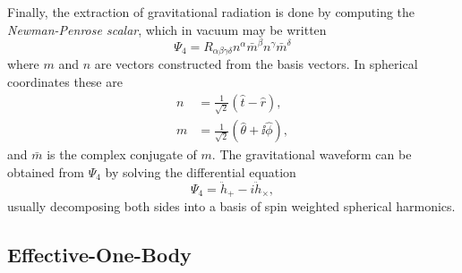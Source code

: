 Finally, the extraction of gravitational radiation is done by computing 
the \emph{Newman-Penrose scalar}, which in vacuum may be written
%
%
\begin{equation*}
\Psi_4 = R_{\alpha \beta \gamma \delta} n^\alpha \bar{m}^\beta n^\gamma
\bar{m}^\delta
\end{equation*}
%
where $m$ and $n$ are vectors constructed from the basis vectors.
In spherical coordinates these are
%
\begin{align*}
n &= \frac{1}{\sqrt{2}} \left(\hat{t} - \hat{r}\right), \\
m &= \frac{1}{\sqrt{2}} \left(\hat{\theta} +\ii  \hat{\phi}\right),
\end{align*}
%
and $\bar{m}$ is the complex conjugate of $m$. The gravitational waveform
can be obtained from $\Psi_4$ by solving the differential equation
%
\begin{equation*}
\Psi_4 = \ddot{h}_+ - i \ddot{h}_\times,
\end{equation*}
%
usually decomposing both sides into a basis of spin weighted spherical 
harmonics.

\subsection{Effective-One-Body}
\label{ssec:EOB}

